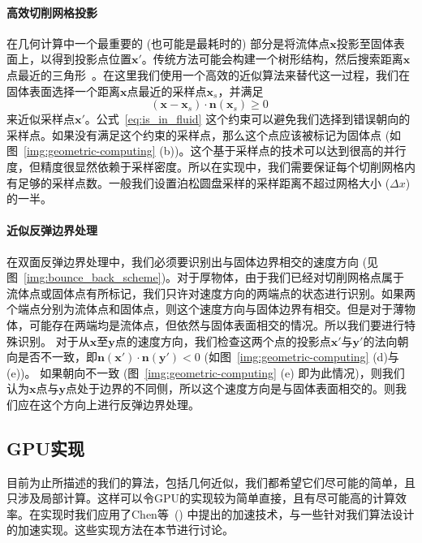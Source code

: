 \paragraph{高效切削网格投影}
在几何计算中一个最重要的 (也可能是最耗时的) 部分是将流体点$\bm{x}$投影至固体表面上，以得到投影点位置$\bm{x}'$。传统方法可能会构建一个树形结构，然后搜索距离$\bm{x}$点最近的三角形~\cite{wang-2012}。在这里我们使用一个高效的近似算法来替代这一过程，我们在固体表面选择一个距离$\bm{x}$点最近的采样点$\bm{x}_s$，并满足
\begin{equation}\label{eq:is_in_fluid}
(\bm{x}-\bm{x}_s)\cdot \bm{n}(\bm{x}_s) \geq 0\;
\end{equation}
来近似采样点$\bm{x}'$。公式~\ref{eq:is_in_fluid} 这个约束可以避免我们选择到错误朝向的采样点。如果没有满足这个约束的采样点，那么这个点应该被标记为固体点 (如图~\ref{img:geometric-computing} (b))。这个基于采样点的技术可以达到很高的并行度，但精度很显然依赖于采样密度。所以在实现中，我们需要保证每个切削网格内有足够的采样点数。一般我们设置泊松圆盘采样的采样距离不超过网格大小 ($\Delta x$) 的一半。

\paragraph{近似反弹边界处理}
在双面反弹边界处理中，我们必须要识别出与固体边界相交的速度方向 (见图~\ref{img:bounce_back_scheme})。对于厚物体，由于我们已经对切削网格点属于流体点或固体点有所标记，我们只许对速度方向的两端点的状态进行识别。如果两个端点分别为流体点和固体点，则这个速度方向与固体边界有相交。但是对于薄物体，可能存在两端均是流体点，但依然与固体表面相交的情况。所以我们要进行特殊识别。
对于从$\bm{x}$至$\bm{y}$点的速度方向，我们检查这两个点的投影点$\bm{x}'$与$\bm{y}'$的法向朝向是否不一致，即$\bm{n}(\bm{x}')\!\cdot\!\bm{n}(\bm{y'})\!<\!0$ (如图~\ref{img:geometric-computing} (d)与(e))。
如果朝向不一致 (图~\ref{img:geometric-computing} (e) 即为此情况)，则我们认为$\bm{x}$点与$\bm{y}$点处于边界的不同侧，所以这个速度方向是与固体表面相交的。则我们应在这个方向上进行反弹边界处理。

\subsection{GPU实现}
目前为止所描述的我们的算法，包括几何近似，我们都希望它们尽可能的简单，且只涉及局部计算。这样可以令GPU的实现较为简单直接，且有尽可能高的计算效率。在实现时我们应用了Chen等~(\citeyear{Chen-2021}) 中提出的加速技术，与一些针对我们算法设计的加速实现。这些实现方法在本节进行讨论。

